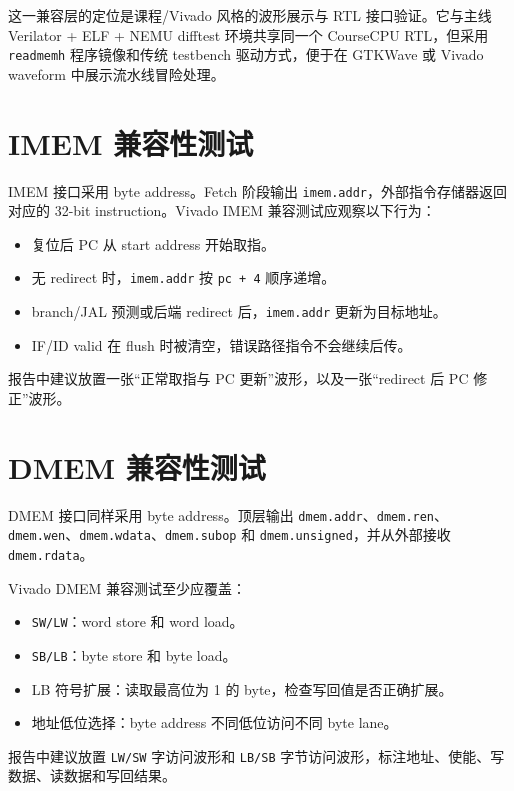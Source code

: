 \documentclass[UTF8,a4paper,12pt]{ctexrep}
\begin{document}
这一兼容层的定位是课程/Vivado 风格的波形展示与 RTL 接口验证。它与主线 Verilator + ELF + NEMU difftest 环境共享同一个 CourseCPU RTL，但采用 \texttt{readmemh} 程序镜像和传统 testbench 驱动方式，便于在 GTKWave 或 Vivado waveform 中展示流水线冒险处理。

\section{IMEM 兼容性测试}

IMEM 接口采用 byte address。Fetch 阶段输出 \texttt{imem.addr}，外部指令存储器返回对应的 32-bit instruction。Vivado IMEM 兼容测试应观察以下行为：

\begin{itemize}
  \item 复位后 PC 从 start address 开始取指。
  \item 无 redirect 时，\texttt{imem.addr} 按 \texttt{pc + 4} 顺序递增。
  \item branch/JAL 预测或后端 redirect 后，\texttt{imem.addr} 更新为目标地址。
  \item IF/ID valid 在 flush 时被清空，错误路径指令不会继续后传。
\end{itemize}

报告中建议放置一张“正常取指与 PC 更新”波形，以及一张“redirect 后 PC 修正”波形。

\section{DMEM 兼容性测试}

DMEM 接口同样采用 byte address。顶层输出 \texttt{dmem.addr}、\texttt{dmem.ren}、\texttt{dmem.wen}、\texttt{dmem.wdata}、\texttt{dmem.subop} 和 \texttt{dmem.unsigned}，并从外部接收 \texttt{dmem.rdata}。

Vivado DMEM 兼容测试至少应覆盖：

\begin{itemize}
  \item \texttt{SW/LW}：word store 和 word load。
  \item \texttt{SB/LB}：byte store 和 byte load。
  \item LB 符号扩展：读取最高位为 1 的 byte，检查写回值是否正确扩展。
  \item 地址低位选择：byte address 不同低位访问不同 byte lane。
\end{itemize}

报告中建议放置 \texttt{LW/SW} 字访问波形和 \texttt{LB/SB} 字节访问波形，标注地址、使能、写数据、读数据和写回结果。
\end{document}
